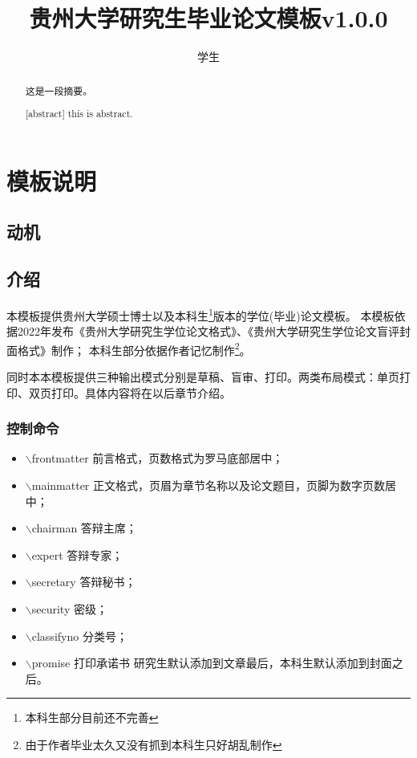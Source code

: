 \documentclass[version=evaluate,type=doctor,oneside]{GZUthesis} %
\author{学生}
\title{贵州大学研究生毕业论文模板v1.0.0}
\begin{document}
\maketitle
\frontmatter
\begin{abstract}
	这是一段摘要。
\end{abstract}
\begin{abstract}[abstract]
	this is abstract.
\end{abstract}
\tableofcontents
\mainmatter
\chapter{模板说明}
\section{动机}
\section{介绍}
本模板提供贵州大学硕士博士以及本科生\footnote{本科生部分目前还不完善}版本的学位(毕业)论文模板。
本模板依据2022年发布《贵州大学研究生学位论文格式》、《贵州大学研究生学位论文盲评封面格式》制作；
本科生部分依据作者记忆制作\footnote{由于作者毕业太久又没有抓到本科生只好胡乱制作}。

同时本本模板提供三种输出模式分别是草稿、盲审、打印。两类布局模式：单页打印、双页打印。具体内容将在以后章节介绍。
\subsection{控制命令}

\begin{itemize}
    \item $\backslash$frontmatter 前言格式，页数格式为罗马底部居中；
\item $\backslash$mainmatter 正文格式，页眉为章节名称以及论文题目，页脚为数字页数居中；
\item $\backslash$chairman 答辩主席；
\item $\backslash$expert 答辩专家；
\item $\backslash$secretary 答辩秘书；
\item $\backslash$security 密级；
\item $\backslash$classifyno 分类号；
\item $\backslash$promise 打印承诺书 研究生默认添加到文章最后，本科生默认添加到封面之后。
\end{itemize}
\end{document}
